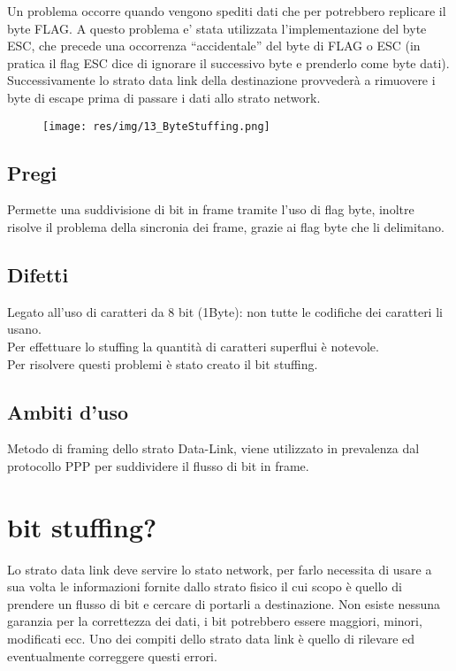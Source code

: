 Un problema occorre quando vengono spediti dati che per potrebbero replicare il byte FLAG. A questo problema e' stata utilizzata l'implementazione del byte ESC, che precede una occorrenza “accidentale” del byte di FLAG o ESC (in pratica il flag ESC dice di ignorare il successivo byte e prenderlo come byte dati). Successivamente lo strato data link della destinazione provvederà a rimuovere i byte di escape prima di passare i dati allo strato network.


\begin{figure}[H]
\centering
\texttt{[image: res/img/13\_ByteStuffing.png]}
\end{figure}

\subsection{Pregi}
Permette una suddivisione di bit in frame tramite l'uso di flag byte, inoltre risolve il problema della sincronia dei frame, grazie ai flag byte che li delimitano.

\subsection{Difetti}
Legato all'uso di caratteri da 8 bit (1Byte): non tutte le codifiche dei caratteri li usano.\\
Per effettuare lo stuffing la quantità di caratteri superflui è notevole.\\
Per risolvere questi problemi è stato creato il bit stuffing.

\subsection{Ambiti d'uso}
Metodo di framing dello strato Data-Link, viene utilizzato in prevalenza dal protocollo PPP per suddividere il flusso di bit in frame.

\section{bit stuffing?}

Lo strato data link deve servire lo stato network, per farlo necessita di usare a sua volta le informazioni fornite dallo strato fisico il cui scopo è quello di prendere un flusso di bit e cercare di portarli a destinazione.
Non esiste nessuna garanzia per la correttezza dei dati, i bit potrebbero essere maggiori, minori, modificati ecc. Uno dei compiti dello strato data link è quello di rilevare ed eventualmente correggere questi errori.
